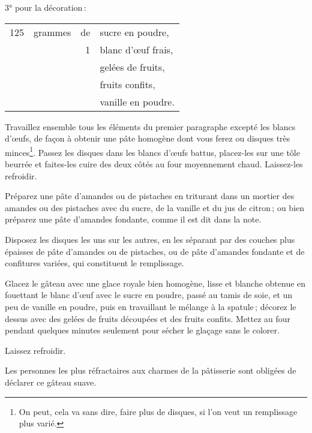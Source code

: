 3° pour la décoration :

\footnotesize
\begin{longtable}{rrrp{16em}}
    125 & grammes & de & sucre en poudre,                                                                 \\
        &         &  1 & blanc d'œuf frais,                                                               \\
        &         &    & gelées de fruits,                                                                \\
        &         &    & fruits confits,                                                                  \\
        &         &    & vanille en poudre.                                                               \\
\end{longtable}
\normalsize

Travaillez ensemble tous les éléments du premier paragraphe excepté les blancs
d'œufs, de façon à obtenir une pâte homogène dont vous ferez {\mmm} ou
{\mmm} disques très minces\footnote{On peut, cela va sans dire, faire plus
de disques, si l'on veut un remplissage plus varié.}. Passez les disques dans
les blancs d'œufs battus, placez-les sur une tôle beurrée et faites-les cuire
des deux côtés au four moyennement chaud. Laissez-les refroidir.

Préparez une pâte d'amandes ou de pistaches en triturant dans un mortier des
amandes ou des pistaches avec du sucre, de la vanille et du jus de citron ; ou
bien préparez une pâte d'amandes fondante, comme il est dit dans la note.

Disposez les disques les uns sur les autres, en les séparant par des couches
plus épaisses de pâte d'amandes ou de pistaches, ou de pâte d'amandes fondante
et de confitures variées, qui constituent le remplissage.

Glacez le gâteau avec une glace royale bien homogène, lisse et blanche obtenue
en fouettant le blanc d'œuf avec le sucre en poudre, passé au tamis de soie, et
un peu de vanille en poudre, puis en travaillant le mélange à la spatule ;
décorez le dessus avec des gelées de fruits découpées et des fruits confits.
Mettez au four pendant quelques minutes seulement pour sécher le glaçage sans
le colorer.

Laissez refroidir.

Les personnes les plus réfractaires aux charmes de la pâtisserie sont obligées
de déclarer ce gâteau suave.

